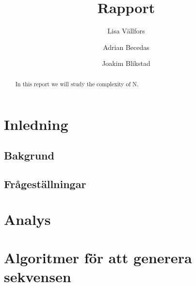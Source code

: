 \documentclass[a4paperi,titlepage,onesided,draft]{article}
\title{Rapport}
\author{Lisa Vällfors \and Adrian Becedas \and Joakim Blikstad}
\begin{document}
\maketitle

\begin{abstract}
    In this report we will study the complexity of N.
\end{abstract}

\tableofcontents 
\newpage

\section{Inledning}

\subsection{Bakgrund}

\subsection{Frågeställningar}


\section{Analys}

\section{Algoritmer för att generera sekvensen}
\end{document}
